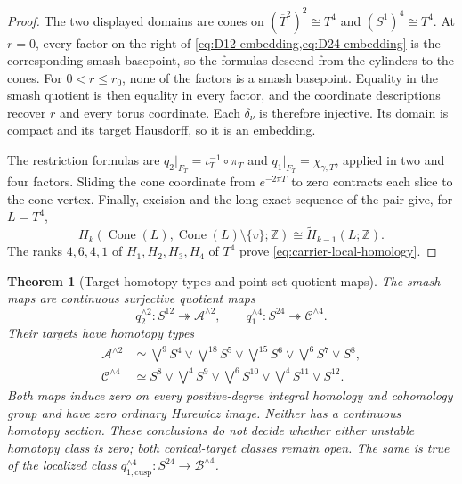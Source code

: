 \documentclass[11pt,letterpaper]{article}
\numberwithin{equation}{section}
\newtheorem{theorem}{Theorem}[section]
\theoremstyle{definition}
\theoremstyle{remark}
\newcommand{\Z}{\mathbb Z}
\newcommand{\Cone}{\operatorname{Cone}}
\begin{document}
\begin{proof}
The two displayed domains are cones on
\((\overline T^2)^2\cong T^4\) and \((S^1)^4\cong T^4\).  At \(r=0\),
every factor on the right of
\cref{eq:D12-embedding,eq:D24-embedding} is the corresponding smash
basepoint, so the formulas descend from the cylinders to the cones.  For
\(0<r\leq r_0\), none of the factors is a smash basepoint.  Equality in
the smash quotient is then equality in every factor, and the coordinate
descriptions recover \(r\) and every torus coordinate.  Each
\(\delta_\nu\) is therefore injective.  Its domain is compact and its
target Hausdorff, so it is an embedding.

The restriction formulas are
\(q_2|_{F_T}=\iota_T^{-1}\circ\pi_T\) and
\(q_1|_{F_T}=\chi_{\gamma,T}\), applied in two and four factors.
Sliding the cone coordinate from \(e^{-2\pi T}\) to zero contracts each
slice to the cone vertex.  Finally, excision and the long exact sequence
of the pair give, for \(L=T^4\),
\[
 H_k(\Cone(L),\Cone(L)\setminus\{v\};\Z)
 \cong\widetilde H_{k-1}(L;\Z).
\]
The ranks \(4,6,4,1\) of \(H_1,H_2,H_3,H_4\) of \(T^4\) prove
\cref{eq:carrier-local-homology}.
\end{proof}

\begin{theorem}[Target homotopy types and point-set quotient maps]
\label{thm:target-homotopy-types}
The smash maps are continuous surjective quotient maps
\[
 q_2^{\wedge2}:S^{12}\twoheadrightarrow\mathcal A^{\wedge2},
 \qquad
 q_1^{\wedge4}:S^{24}\twoheadrightarrow\mathcal C^{\wedge4}.
\]
Their targets have homotopy types
\begin{align}
 \mathcal A^{\wedge2}
 &\simeq
 \bigvee^9S^4\vee\bigvee^{18}S^5\vee
 \bigvee^{15}S^6\vee\bigvee^6S^7\vee S^8,
 \label{eq:A-smash-wedge}\\
 \mathcal C^{\wedge4}
 &\simeq
 S^8\vee\bigvee^4S^9\vee\bigvee^6S^{10}
 \vee\bigvee^4S^{11}\vee S^{12}.
 \label{eq:C-smash-wedge}
\end{align}
Both maps induce zero on every positive-degree integral homology and
cohomology group and have zero ordinary Hurewicz image.  Neither has a
continuous homotopy section.  These conclusions do not decide whether
either unstable homotopy class is zero; both conical-target classes remain
open.  The same is true of the localized class
\(q_{1,\mathrm{cusp}}^{\wedge4}:S^{24}\to\mathcal B^{\wedge4}\).
\end{theorem}
\end{document}

